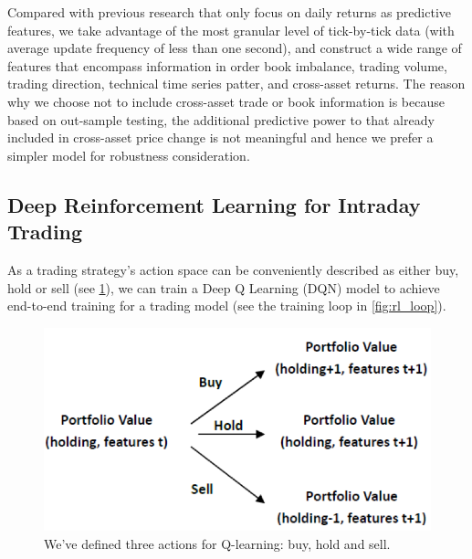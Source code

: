 \documentclass{article}
\begin{document}
Compared with previous research that only focus on daily returns as predictive features, we take advantage of the most granular level of tick-by-tick data (with average update frequency of less than one second), and construct a wide range of features that encompass information in order book imbalance, trading volume, trading direction, technical time series patter, and cross-asset returns. The reason why we choose not to include cross-asset trade or book information is because based on out-sample testing, the additional predictive power to that already included in cross-asset price change is not meaningful and hence we prefer a simpler model for robustness consideration.

\subsection{Deep Reinforcement Learning for Intraday Trading}

As a trading strategy’s action space can be conveniently described as either buy, hold or sell (see \ref{fig:rl_strat}), we can train a Deep Q Learning (DQN) model to achieve end-to-end training for a trading model (see the training loop in \ref{fig:rl_loop}). 

\begin{figure}[h]
	\includegraphics[width=\linewidth]{rl_strat.png}
	\caption{We've defined three actions for Q-learning: buy, hold and sell.}
	\label{fig:rl_strat}
\end{figure}
\end{document}
